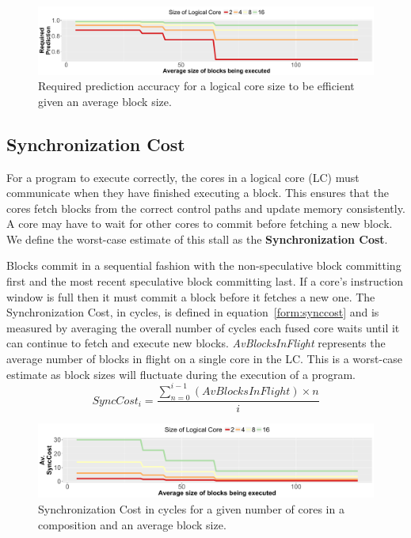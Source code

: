 \begin{figure}[t]
    \centering
    \includegraphics[width=\textwidth]{graphics/limit_study/prediction_req.pdf}
\vspace*{-5mm}
    \caption{Required prediction accuracy for a logical core size to be efficient given an average block size.}
    \label{fig:req_pred}
\vspace{5mm}
\end{figure}
\subsection{Synchronization Cost}


For a program to execute correctly, the cores in a logical core (LC) must communicate when they have finished executing a block. 
This ensures that the cores fetch blocks from the correct control paths and update memory consistently.
A core may have to wait for other cores to commit before fetching a new block. 
We define the worst-case estimate of this stall as the \textbf{Synchronization Cost}.

Blocks commit in a sequential fashion with the non-speculative block committing first and the most recent speculative block committing last.
If a core's instruction window is full then it must commit a block before it fetches a new one.
The Synchronization Cost, in cycles, is defined in equation~\ref{form:synccost} and is measured by averaging the overall number of cycles each fused core waits until it can continue to fetch and execute new blocks.
\textit{AvBlocksInFlight} represents the average number of blocks in flight on a single core in the LC.
This is a worst-case estimate as block sizes will fluctuate during the execution of a program.
\vspace{5mm}
\begin{equation}\label{form:synccost}
SyncCost_i = \frac{\sum_{n=0}^{i-1}\left(AvBlocksInFlight \right) \times n }{i}
\end{equation}
\vspace{5mm}

\begin{figure}[t]
    \centering
    \includegraphics[width=\textwidth]{graphics/limit_study/sync_cost.pdf}
\vspace*{-5mm}
    \caption{Synchronization Cost in cycles for a given number of cores in a composition and an average block size.} %
    \label{fig:sync_cost}
\end{figure}



